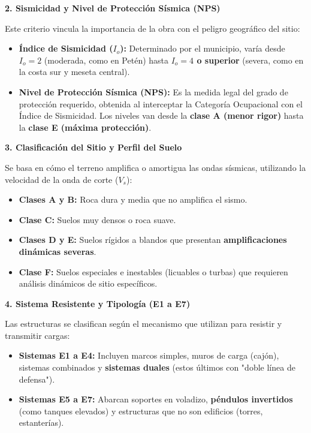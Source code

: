 \documentclass[14pt,letterpaper]{extarticle}
\begin{document}
	\textbf{2. Sismicidad y Nivel de Protección Sísmica (NPS)}
	
	Este criterio vincula la importancia de la obra con el peligro geográfico del sitio:
	
	\begin{itemize}
		\item \textbf{Índice de Sismicidad ($I_o$):} Determinado por el municipio, varía desde $I_o=2$ (moderada, como en Petén) hasta \textbf{$I_o=4$ o superior} (severa, como en la costa sur y meseta central).
		
		\item \textbf{Nivel de Protección Sísmica (NPS):} Es la medida legal del grado de protección requerido, obtenida al interceptar la Categoría Ocupacional con el Índice de Sismicidad. Los niveles van desde la \textbf{clase A (menor rigor)} hasta la \textbf{clase E (máxima protección)}.
	\end{itemize}
	
	\textbf{3. Clasificación del Sitio y Perfil del Suelo}
	
	Se basa en cómo el terreno amplifica o amortigua las ondas sísmicas, utilizando la velocidad de la onda de corte ($V_s$):
	
	\begin{itemize}
		\item \textbf{Clases A y B:} Roca dura y media que no amplifica el sismo.
		
		\item \textbf{Clase C:} Suelos muy densos o roca suave.
		
		\item \textbf{Clases D y E:} Suelos rígidos a blandos que presentan \textbf{amplificaciones dinámicas severas}.
		
		\item \textbf{Clase F:} Suelos especiales e inestables (licuables o turbas) que requieren análisis dinámicos de sitio específicos.
	\end{itemize}
	
	\textbf{4. Sistema Resistente y Tipología (E1 a E7)}
	
	Las estructuras se clasifican según el mecanismo que utilizan para resistir y transmitir cargas:
	
	\begin{itemize}
		\item \textbf{Sistemas E1 a E4:} Incluyen marcos simples, muros de carga (cajón), sistemas combinados y \textbf{sistemas duales} (estos últimos con "doble línea de defensa").
		
		\item \textbf{Sistemas E5 a E7:} Abarcan soportes en voladizo, \textbf{péndulos invertidos} (como tanques elevados) y estructuras que no son edificios (torres, estanterías).
	\end{itemize}
	
\end{document}
